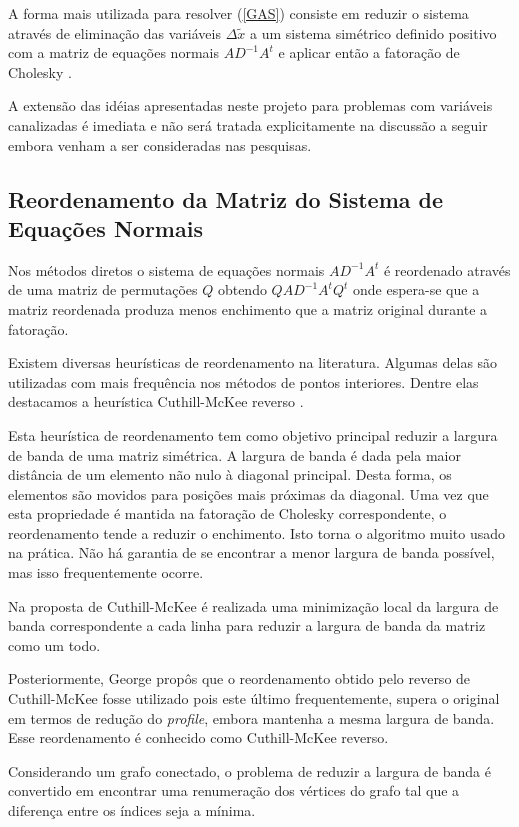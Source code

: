 \documentclass[12pt]{article}
\begin{document}
A forma mais utilizada para resolver (\ref{GAS}) consiste em reduzir o
sistema através de eliminação das variáveis  $\Delta \tilde{x}$ a um sistema
simétrico definido positivo com a matriz de equações normais
$AD^{-1}A^t$ e aplicar então a fatoração de Cholesky
\cite{ARVK89,CMWW96,Go96}.

A extensão das idéias apresentadas neste projeto para problemas com
variáveis canalizadas é imediata e não será tratada explicitamente na
discussão a seguir embora venham a ser consideradas nas pesquisas.

\subsection{Reordenamento da Matriz do Sistema de Equações Normais}

Nos métodos diretos o sistema de equações normais
$AD^{-1}A^t$ é reordenado através de uma matriz de
permutações $Q$ obtendo $QAD^{-1}A^tQ^t$ onde espera-se
que a matriz reordenada produza menos enchimento que a
matriz original durante a fatoração.

Existem diversas heurísticas de reordenamento na literatura.
Algumas delas são utilizadas com mais frequência nos métodos
de pontos interiores. Dentre elas destacamos a heurística
Cuthill-McKee reverso \cite{CM69}.

Esta heurística de reordenamento tem como objetivo
principal reduzir a largura de banda de uma matriz simétrica. A largura
de banda é dada pela maior distância de um elemento não nulo à diagonal
principal. Desta forma, os elementos são movidos para posições mais
próximas da diagonal.
Uma vez que esta propriedade é mantida na fatoração de
Cholesky correspondente, o reordenamento tende a reduzir o enchimento.
Isto torna o algoritmo muito usado na prática. Não há garantia de se encontrar
a menor largura de banda possível, mas isso frequentemente ocorre.

Na proposta de Cuthill-McKee é realizada uma minimização local da
largura de banda correspondente a cada linha para reduzir a largura de
banda da matriz como um todo.

Posteriormente, George \cite{Geo71} propôs que o reordenamento obtido pelo
reverso de Cuthill-McKee fosse utilizado pois este último
frequentemente, supera o original em termos de redução do {\it profile},
embora mantenha a mesma largura de banda. Esse reordenamento é conhecido
como Cuthill-McKee reverso.

Considerando um grafo conectado, o problema de reduzir a largura de banda
é convertido em encontrar uma renumeração dos vértices do grafo tal que
a diferença entre os índices seja a mínima.
\end{document}
